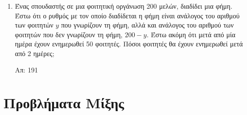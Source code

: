 \begin{enumerate}
  \item Ένας σπουδαστής σε μια φοιτητική οργάνωση 200 μελών, διαδίδει μια φήμη. Έστω 
    ότι ο ρυθμός με τον οποίο διαδίδεται η φήμη είναι ανάλογος του αριθμού των φοιτητών 
    $y$ που γνωρίζουν τη φήμη, αλλά και ανάλογος του αριθμού των φοιτητών που δεν 
    γνωρίζουν τη φήμη, $ 200-y $. Έστω ακόμη ότι μετά από μία ημέρα έχουν ενημερωθεί 
    50 φοιτητές. Πόσοι φοιτητές θα έχουν ενημερωθεί μετά από 2 ημέρες;

    \hfill Απ: 191  
\end{enumerate}


\section*{Προβλήματα Μίξης}

